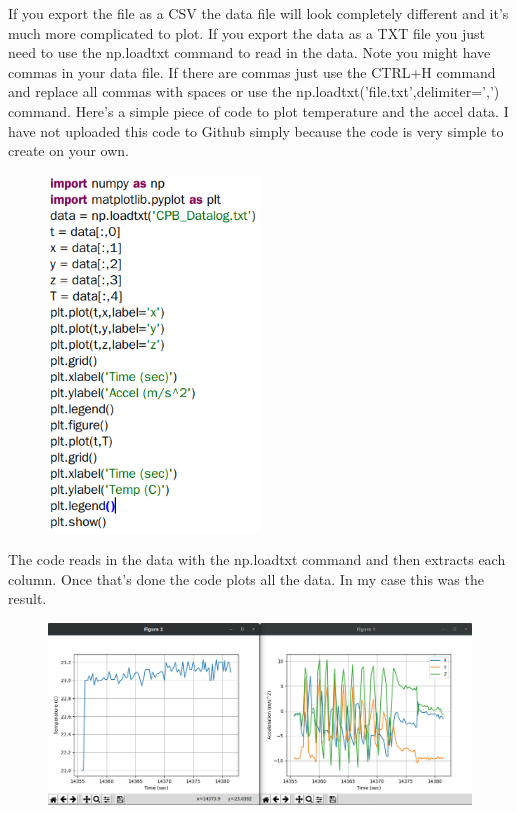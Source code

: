 If you export the file as a CSV the data file will look completely different and it's much more complicated to plot. If you export the data as a TXT file you just need to use the np.loadtxt command to read in the data. Note you might have commas in your data file. If there are commas just use the CTRL+H command and replace all commas with spaces or use the np.loadtxt('file.txt',delimiter=',') command. Here's a simple piece of code to plot temperature and the accel data. I have not uploaded this code to Github simply because the code is very simple to create on your own.
\begin{figure}[H]
  \begin{center}
    \includegraphics[width=0.5\textwidth]{Figures/phoneapp_plotcode.png}
  \end{center}
\end{figure}
The code reads in the data with the np.loadtxt command and then extracts each column. Once that's done the code plots all the data. In my case this was the result.
\begin{figure}[H]
  \begin{center}
    \includegraphics[width=\textwidth]{Figures/phoneapp_plots.png}
  \end{center}
\end{figure}

